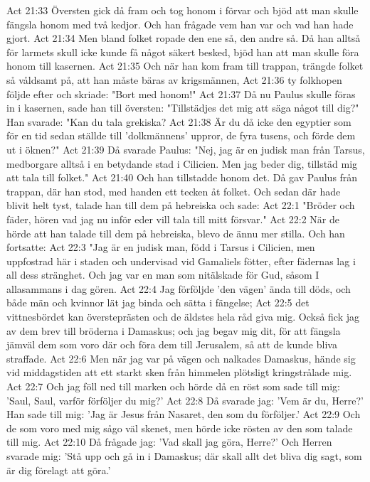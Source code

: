 Act 21:33  Översten gick då fram och tog honom i förvar och bjöd att man skulle fängsla honom med två kedjor. Och han frågade vem han var och vad han hade gjort.
Act 21:34  Men bland folket ropade den ene så, den andre så. Då han alltså för larmets skull icke kunde få något säkert besked, bjöd han att man skulle föra honom till kasernen.
Act 21:35  Och när han kom fram till trappan, trängde folket så våldsamt på, att han måste bäras av krigsmännen,
Act 21:36  ty folkhopen följde efter och skriade: "Bort med honom!"
Act 21:37  Då nu Paulus skulle föras in i kasernen, sade han till översten: "Tillstädjes det mig att säga något till dig?" Han svarade: "Kan du tala grekiska?
Act 21:38  Är du då icke den egyptier som för en tid sedan ställde till 'dolkmännens' uppror, de fyra tusens, och förde dem ut i öknen?"
Act 21:39  Då svarade Paulus: "Nej, jag är en judisk man från Tarsus, medborgare alltså i en betydande stad i Cilicien. Men jag beder dig, tillstäd mig att tala till folket."
Act 21:40  Och han tillstadde honom det. Då gav Paulus från trappan, där han stod, med handen ett tecken åt folket. Och sedan där hade blivit helt tyst, talade han till dem på hebreiska och sade:
Act 22:1  "Bröder och fäder, hören vad jag nu inför eder vill tala till mitt försvar."
Act 22:2  När de hörde att han talade till dem på hebreiska, blevo de ännu mer stilla. Och han fortsatte:
Act 22:3  "Jag är en judisk man, född i Tarsus i Cilicien, men uppfostrad här i staden och undervisad vid Gamaliels fötter, efter fädernas lag i all dess stränghet. Och jag var en man som nitälskade för Gud, såsom I allasammans i dag gören.
Act 22:4  Jag förföljde 'den vägen' ända till döds, och både män och kvinnor lät jag binda och sätta i fängelse;
Act 22:5  det vittnesbördet kan översteprästen och de äldstes hela råd giva mig. Också fick jag av dem brev till bröderna i Damaskus; och jag begav mig dit, för att fängsla jämväl dem som voro där och föra dem till Jerusalem, så att de kunde bliva straffade.
Act 22:6  Men när jag var på vägen och nalkades Damaskus, hände sig vid middagstiden att ett starkt sken från himmelen plötsligt kringstrålade mig.
Act 22:7  Och jag föll ned till marken och hörde då en röst som sade till mig: 'Saul, Saul, varför förföljer du mig?'
Act 22:8  Då svarade jag: 'Vem är du, Herre?' Han sade till mig: 'Jag är Jesus från Nasaret, den som du förföljer.'
Act 22:9  Och de som voro med mig sågo väl skenet, men hörde icke rösten av den som talade till mig.
Act 22:10  Då frågade jag: 'Vad skall jag göra, Herre?' Och Herren svarade mig: 'Stå upp och gå in i Damaskus; där skall allt det bliva dig sagt, som är dig förelagt att göra.'

